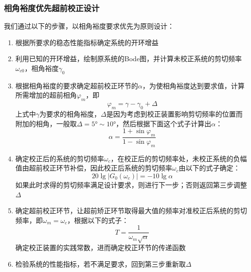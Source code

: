 \subsubsection{相角裕度优先超前校正设计}
我们通过以下的步骤，以相角裕度要求优先为原则设计：
\begin{enumerate}
    \item 根据所要求的稳态性能指标确定系统的开环增益
    \item 利用已知的开环增益，绘制原系统的Bode图，并计算未校正系统的剪切频率$\omega_{c0}$，相角裕度$\gamma_0$
    \item 根据相角裕度的要求确定超前校正环节的$\alpha$，为使相角裕度达到要求值，计算所需增加的超前相角$\varphi_m$，即
    \begin{equation*}
        \varphi_m = \gamma - \gamma_0 + \Delta
    \end{equation*}
    上式中$\gamma$为要求的相角裕度，$\Delta$是因为考虑到校正装置影响剪切频率的位置而附加的相角，一般取$\Delta = 5\text{°} \sim  10 \text{°}$，然后根据下面这个式子计算出$\alpha$：
    \begin{equation*}
        \alpha = \frac{1+\sin \varphi_m}{1-\sin \varphi_m}
    \end{equation*}
    \item 确定校正后的系统的剪切频率$\omega_c$，在校正后的剪切频率处，未校正系统的负幅值由超前校正环节补偿，因此校正后系统的剪切频率$\omega_c$由以下的式子确定：
    \begin{equation*}
        20 \lg \left\lvert G_0(\omega_c) \right\rvert = -10 \lg \alpha
    \end{equation*}
    如果此时求得的剪切频率满足设计要求，则进行下一步；否则返回第三步调整$\Delta$
    \item 确定超前校正环节，让超前矫正环节取得最大值的频率对准校正后系统的剪切频率，即$\omega_m = \omega_c$，根据以下的式子：
    \begin{equation*}
        T = \frac{1}{\omega_m \sqrt{\alpha}}
    \end{equation*}
    确定校正装置的实践常数，进而确定校正环节的传递函数
    \item 检验系统的性能指标，若不满足要求，回到第三步重新取$\Delta$
\end{enumerate}


